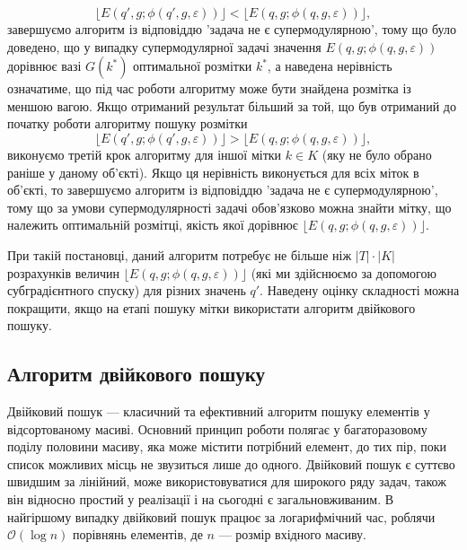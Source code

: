 \begin{enumerate}
\begin{equation*}
        \lfloor E(q',g;\phi(q',g,\varepsilon))\rfloor < \lfloor E(q,g;\phi(q,g,\varepsilon))\rfloor, 
    \end{equation*}
    завершуємо алгоритм із відповіддю 'задача не є супермодулярною', тому що
    було доведено, що у випадку супермодулярної задачі значення $E(q,g;\phi(q,g,\varepsilon))$ дорівнює 
    вазі $G(k^*)$ оптимальної розмітки $k^*$, а наведена нерівність означатиме, що під час роботи алгоритму може бути знайдена 
    розмітка із меншою вагою. Якщо отриманий результат більший за той, що був отриманий до початку роботи алгоритму пошуку розмітки
    \begin{equation*}
        \lfloor E(q',g;\phi(q',g,\varepsilon))\rfloor > \lfloor E(q,g;\phi(q,g,\varepsilon))\rfloor, 
    \end{equation*}
    виконуємо третій крок алгоритму для іншої мітки $k\in K$ (яку не було обрано раніше у даному об'єкті).
    Якщо ця нерівність виконується для всіх міток в об'єкті, то завершуємо алгоритм із 
    відповіддю 'задача не є супермодулярною', тому що за умови супермодулярності задачі обов'язково можна знайти мітку, що
    належить оптимальній розмітці, якість якої дорівнює $\lfloor E(q,g;\phi(q,g,\varepsilon))\rfloor$.
\end{enumerate}

При такій постановці, даний алгоритм потребує не більше ніж $|T|\cdot|K|$ розрахунків величин 
$\lfloor E(q,g;\phi(q,g,\varepsilon))\rfloor$ (які ми здійснюємо за допомогою субградієнтного спуску) для різних значень $q'$.
Наведену оцінку складності можна покращити, якщо на етапі пошуку мітки використати алгоритм двійкового пошуку.

\subsection{Алгоритм двійкового пошуку}

Двійковий пошук --- класичний та ефективний алгоритм пошуку елементів у відсортованому масиві.
Основний принцип роботи полягає у багаторазовому поділу половини масиву, яка може містити потрібний 
елемент, до тих пір, поки список можливих місць не звузиться лише до одного.
Двійковий пошук є суттєво швидшим за лінійний, може використовуватися для широкого ряду задач, також він відносно простий у реалізації і на сьогодні є
загальновживаним. В найгіршому випадку двійковий пошук працює за логарифмічний час, роблячи $\mathcal{O}(\log n)$ 
порівнянь елементів, де $n$ --- розмір вхідного масиву.

